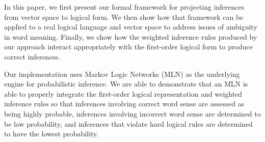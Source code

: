 In this paper, we first present our formal framework for projecting inferences
from vector space to logical form.  We then show how that framework can be
applied to a real logical language and vector space to address issues of
ambiguity in word meaning.  Finally, we show how the weighted inference rules
produced by our approach interact appropriately with the first-order logical
form to produce correct inferences.

Our implementation uses Markov Logic Networks (MLN)\citep{richardson:mlj06} as
the underlying engine for probabilistic inference.  We are able to demonstrate
that an MLN is able to properly integrate the first-order logical representation
and weighted inference rules so that inferences involving correct word sense are
assessed as being highly probable, inferences involving incorrect word sense are
determined to be low probability, and inferences that violate hard logical rules
are determined to have the lowest probability.
